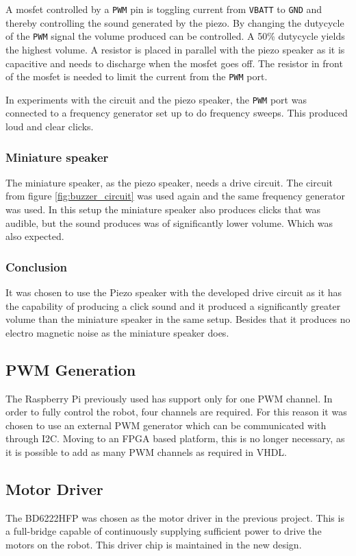 A mosfet controlled by a \texttt{PWM} pin is toggling current from \texttt{VBATT} to \texttt{GND} and thereby controlling the sound generated by the piezo.
By changing the dutycycle of the \texttt{PWM} signal the volume produced can be controlled. 
A 50\% dutycycle yields the highest volume. 
A resistor is placed in parallel with the piezo speaker as it is capacitive and needs to discharge when the mosfet goes off.
The resistor in front of the mosfet is needed to limit the current from the \texttt{PWM} port. 

In experiments with the circuit and the piezo speaker, the \texttt{PWM} port was connected to a frequency generator set up to do frequency sweeps.
This produced loud and clear clicks.

\subsubsection*{Miniature speaker}
The miniature speaker, as the piezo speaker, needs a drive circuit. 
The circuit from figure \ref{fig:buzzer_circuit} was used again and the same frequency generator was used. 
In this setup the miniature speaker also produces clicks that was audible, but the sound produces was of significantly lower volume.
Which was also expected.  

\subsubsection*{Conclusion}
It was chosen to use the Piezo speaker with the developed drive circuit as it has the capability of producing a click sound and it produced a significantly greater volume than the miniature speaker in the same setup. 
Besides that it produces no electro magnetic noise as the miniature speaker does. 

\subsection{PWM Generation} %
\label{sub:pwm_generation}
The Raspberry Pi previously used has support only for one PWM channel.
In order to fully control the robot, four channels are required.
For this reason it was chosen to use an external PWM generator which can be communicated with through I2C.
Moving to an FPGA based platform, this is no longer necessary, as it is possible to add as many PWM channels as required in VHDL\@.

\subsection{Motor Driver} %
\label{sub:motor_driver}
The BD6222HFP was chosen as the motor driver in the previous project.
This is a full-bridge capable of continuously supplying sufficient power to drive the motors on the robot.
This driver chip is maintained in the new design.

